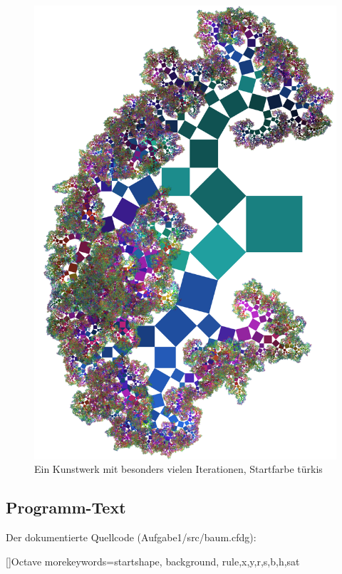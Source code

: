 \begin{figure}[ht]
 \centering
 \includegraphics[width=0.666\textheight, height=\textheight]{bigrot.png}
 \caption{Ein Kunstwerk mit besonders vielen Iterationen, Startfarbe türkis}
\end{figure}
\clearpage

\subsection{Programm-Text}
Der dokumentierte Quellcode (Aufgabe1/src/baum.cfdg):

[]{Octave}
  {morekeywords={startshape, background, rule,x,y,r,s,b,h,sat}}

